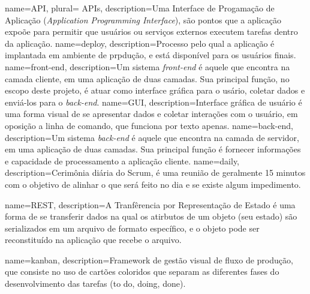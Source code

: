 


 {
    name=API,
    plural= {APIs},
    description={Uma Interface de Progamação de Aplicação (\emph{Application Programming Interface}), são pontos que a
    aplicação expoõe para permitir que usuários ou serviços externos
    executem tarefas dentro da aplicação.}
}
 {
    name=deploy,
    description={Processo pelo qual a aplicação é implantada em ambiente
  de prpdução, e está disponível para os usuários finais.}
}
 {
    name={front-end},
    description={Um sistema \emph{front-end} é aquele que encontra na
    camada cliente, em uma aplicação de duas camadas. Sua
    principal função, no escopo deste projeto, é atuar como interface
    gráfica para o usário, coletar dados e enviá-los para o \emph{back-end}.}
}
 {
    name=GUI,
    description={Interface gráfica de usuário é uma forma visual de se
    apresentar dados e coletar interações com o usuário, em oposição a
    linha de comando, que funciona por texto apenas.}
}
 {
    name={back-end},
    description={Um sistema \emph{back-end} é aquele que encontra na
    camada de servidor, em uma aplicação de duas camadas. Sua
    principal função é fornecer informações e capacidade de
    processamento a aplicação cliente.}
}
 {
    name=daily,
    description={Cerimônia diária do Scrum, é uma reunião de geralmente 15 minutos com o objetivo de alinhar o que será feito no dia e se existe algum impedimento.}
}

 {
    name=REST,
    description={A Tranfêrencia por Representação de Estado é uma forma
    de se transferir dados na qual os atirbutos de um objeto (seu
    estado) são serializados em um arquivo de formato específico, e
    o objeto pode ser reconstituído na aplicação que recebe o arquivo.}
}

 {
    name=kanban,
    description={Framework de gestão visual de fluxo de produção, que consiste no uso de cartões coloridos que separam as diferentes fases do desenvolvimento das tarefas (to do, doing, done).}
}

